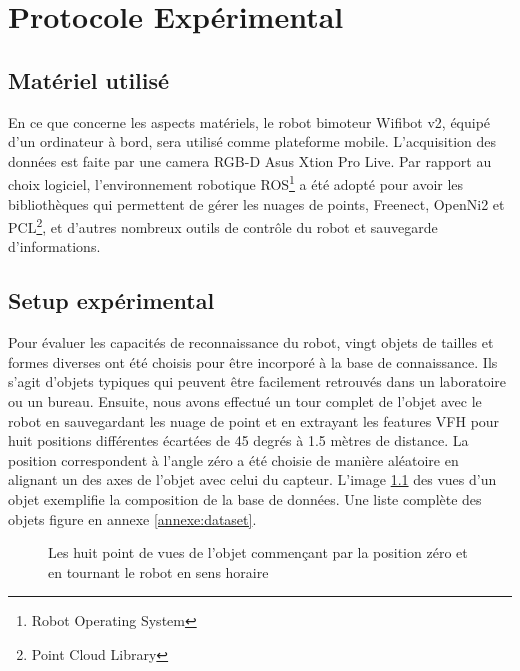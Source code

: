 \chapter {Protocole Expérimental}

\section{Matériel utilisé}
En ce que concerne les aspects matériels, le robot bimoteur Wifibot v2, équipé d'un ordinateur à bord, sera utilisé comme plateforme mobile. L'acquisition des données est faite par une camera RGB-D Asus Xtion Pro Live. Par rapport au choix logiciel, l'environnement robotique ROS\footnote{Robot Operating System} a été adopté pour avoir les bibliothèques qui permettent de gérer les nuages de points, Freenect, OpenNi2 et PCL\footnote{Point Cloud Library}, et d'autres nombreux outils de contrôle du robot et sauvegarde d'informations.

\section{Setup expérimental}
\label{sec:base_donnees}
Pour évaluer les capacités de reconnaissance du robot, vingt objets de tailles et formes diverses ont été choisis pour être incorporé à la base de connaissance. Ils s'agit d'objets typiques qui peuvent être facilement retrouvés dans un laboratoire ou un bureau. Ensuite, nous avons effectué un tour complet de l'objet avec le robot en sauvegardant les nuage de point et en extrayant les features VFH pour huit positions différentes écartées de 45 degrés à 1.5 mètres de distance. La position correspondent à l'angle zéro a été choisie de manière aléatoire en alignant un des axes de l'objet avec celui du capteur. L'image \ref{fig:setup_expe} des vues d'un objet exemplifie la composition de la base de données. Une liste complète des objets figure en annexe \ref{annexe:dataset}.

\begin{figure}[H]
	\caption{Les huit point de vues de l'objet commençant par la position zéro et en tournant le robot en sens horaire}
	\label{fig:setup_expe}
\end{figure}

